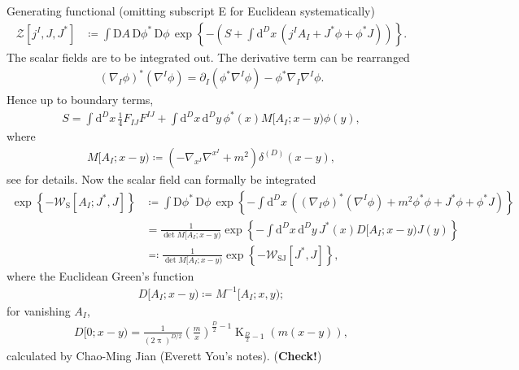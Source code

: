 \documentclass[12pt]{article}
\newcommand\pp{\uppi}
\newcommand\dif{\mathrm{d}}
\newcommand\Dif{\mathrm{D}}
\DeclareMathOperator{\BesselK}{K}
\newcommand{\rbr}[1]{{\left(#1\right)}}
\newcommand{\rfun}[2]{{#1}\mathopen{}\left(#2\right)\mathclose{}}
\newcommand{\sfun}[2]{{#1}\mathopen{}\left[#2\right]\mathclose{}}
\newcommand{\cfun}[2]{{#1}\mathopen{}\left\{#2\right\}\mathclose{}}
\begin{document}
Generating functional (omitting subscript E for Euclidean systematically)
\begin{align}
\sfun{\mathcal{Z}}{j^I, J, J^*} &\coloneqq
\int\Dif A\,\Dif\phi^*\,\Dif\phi\,\cfun{\exp}{-\rbr{S
+\int\dif^{D} x\,\rbr{j^I A_I + J^* \phi+\phi^* J}}}.
\end{align}
The scalar fields are to be integrated out. The derivative term can be 
rearranged
\begin{align}
\rbr{\nabla_{\! I} \phi}^* \rbr{\nabla^{I} \phi} = \partial_I\rbr{\phi^* 
\nabla^{I}\phi} - \phi^* \nabla_{\! I} \nabla^{I} \phi.
\end{align}
Hence up to boundary terms,
\begin{align}
S = \int \dif^D x\, \frac{1}{4} F_{IJ} F^{IJ} +
	\int \dif^D x\,\dif^D y\,
	\rfun{\phi^*}{x} M[A_I; x-y) \rfun{\phi}{y},
\end{align}
where
\begin{align}
M[A_I; x-y) \coloneqq \rbr{-\nabla_{\! x^I} \nabla^{x^I} + m^2} 
\rfun{\delta^{(D)}}{x-y},
\end{align}
see \cite[ch.\ 6]{mosel2004} for details. Now the scalar field can formally be 
integrated
\begin{align}
\cfun{\exp}{-\sfun{\mathcal{W}_\text{S}}{A_I; J^*, J}} &\coloneqq \int 
	\Dif\phi^*\,\Dif\phi\, \cfun{\exp}{-\int\dif^{D} x\, \rbr{
	\rbr{\nabla_{\! I} \phi}^* \rbr{\nabla^{I} \phi} + m^2 \phi^* \phi 
	+ J^* \phi + \phi^* J}}
\nonumber \\
&= \frac{1}{\det M[A_I; x-y)}
	\cfun{\exp}{-\int\dif^D x\,\dif^D y\,
		\rfun{J^*}{x} D[A_I; x-y) \rfun{J}{y} }
\\
&\eqqcolon \frac{1}{\det M[A_I; x-y)}
	\cfun{\exp}{-\sfun{\mathcal{W}_\text{SJ}}{J^*, J}},
\end{align}
where the Euclidean Green's function
\begin{align}
D[A_I; x-y) \coloneqq M^{-1}[A_I; x,y);
\end{align}
for vanishing $A_I$,
\begin{align}
D[0; x-y) = 
	\frac{1}{\rbr{2\pp}^{D/2}} \rbr{\frac{m}{x}}^{\frac{D}{2}-1}
	\rfun{\BesselK_{\frac{D}{2}-1}}{m\rbr{x-y}},
\end{align}
calculated by Chao-Ming Jian (Everett You's notes). (\textbf{Check!})
\end{document}

